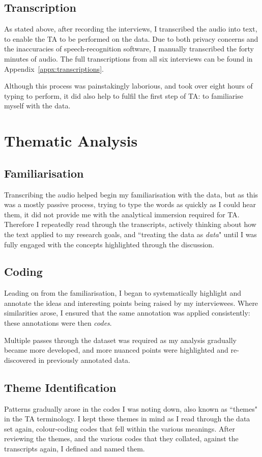 \subsection{Transcription}
As stated above, after recording the interviews, I transcribed the audio into text, to enable the TA to be performed on the data.
Due to both privacy concerns and the inaccuracies of speech-recognition software, I manually transcribed the forty minutes of audio.
The full transcriptions from all six interviews can be found in Appendix~\ref{appx:transcriptions}.

Although this process was painstakingly laborious, and took over eight hours of typing to perform, it did also help to fulfil the first step of TA: to familiarise myself with the data.


\section{Thematic Analysis}
\subsection{Familiarisation}
Transcribing the audio helped begin my familiarisation with the data, but as this was a mostly passive process, trying to type the words as quickly as I could hear them, it did not provide me with the analytical immersion required for TA.
Therefore I repeatedly read through the transcripts, actively thinking about how the text applied to my research goals, and ``treating the data as \textit{data}"\cite{brauminterviewta} until I was fully engaged with the concepts highlighted through the discussion.

\subsection{Coding}
Leading on from the familiarisation, I began to systematically highlight and annotate the ideas and interesting points being raised by my interviewees. 
Where similarities arose, I ensured that the same annotation was applied consistently: these annotations were then \textit{codes}.

Multiple passes through the dataset was required as my analysis gradually became more developed, and more nuanced points were highlighted and re-discovered in previously annotated data.


\subsection{Theme Identification}
Patterns gradually arose in the codes I was noting down, also known as ``themes" in the TA terminology. 
I kept these themes in mind as I read through the data set again, colour-coding codes that fell within the various meanings.
After reviewing the themes, and the various codes that they collated, against the transcripts again, I defined and named them.


